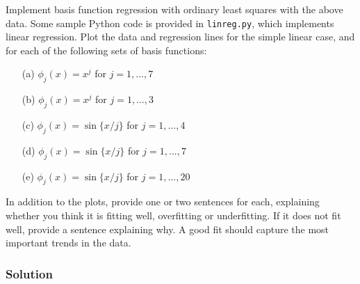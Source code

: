\documentclass[submit]{harvardml}
\begin{document}
\begin{problem}
Implement basis function regression with ordinary least squares with the above
data. Some sample Python code is provided in \verb|linreg.py|, which implements
linear regression.  Plot the data and regression lines for the simple linear
case, and for each of the following sets of basis functions:
\begin{itemize}
	\item[(a)] $\phi_j(x) = x^j$ for $j=1, \ldots, 7$
	\item[(b)] $\phi_j(x) = x^j$ for $j=1, \ldots, 3$
	\item[(c)] $\phi_j(x) = \sin\{ x / j \}$ for $j=1, \ldots, 4$
	\item[(d)] $\phi_j(x) = \sin\{ x / j \}$ for $j=1, \ldots, 7$
	\item[(e)] $\phi_j(x) = \sin\{ x / j \}$ for $j=1, \ldots, 20$
\end{itemize}
  In addition to the plots, provide one or two sentences for each, explaining
  whether you think it is fitting well, overfitting or underfitting.  If it does
  not fit well, provide a sentence explaining why. A good fit should capture the
  most important trends in the data.
	\end{problem}

\subsubsection*{Solution}
\end{document}
